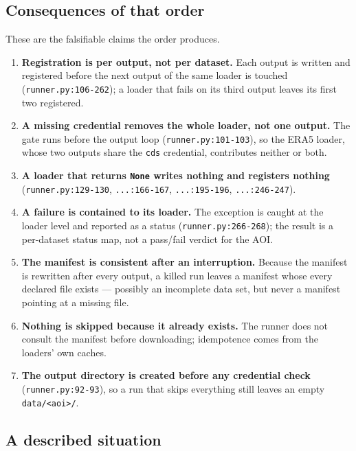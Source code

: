 \documentclass[11pt,a4paper]{article}
\newcommand{\code}[1]{\texttt{#1}}
\begin{document}
\subsection{Consequences of that order}

These are the falsifiable claims the order produces.

\begin{enumerate}
\item \textbf{Registration is per output, not per dataset.} Each output is
written and registered before the next output of the same loader is touched
(\code{runner.py:106-262}); a loader that fails on its third output leaves its
first two registered.
\item \textbf{A missing credential removes the whole loader, not one output.}
The gate runs before the output loop (\code{runner.py:101-103}), so the ERA5
loader, whose two outputs share the \code{cds} credential, contributes
neither or both.
\item \textbf{A loader that returns \code{None} writes nothing and registers
nothing} (\code{runner.py:129-130}, \code{...:166-167}, \code{...:195-196},
\code{...:246-247}).
\item \textbf{A failure is contained to its loader.} The exception is caught
at the loader level and reported as a status (\code{runner.py:266-268}); the
result is a per-dataset status map, not a pass/fail verdict for the AOI.
\item \textbf{The manifest is consistent after an interruption.} Because the
manifest is rewritten after every output, a killed run leaves a manifest
whose every declared file exists --- possibly an incomplete data set, but
never a manifest pointing at a missing file.
\item \textbf{Nothing is skipped because it already exists.} The runner does
not consult the manifest before downloading; idempotence comes from the
loaders' own caches.
\item \textbf{The output directory is created before any credential check}
(\code{runner.py:92-93}), so a run that skips everything still leaves an
empty \code{data/<aoi>/}.
\end{enumerate}

\subsection{A described situation}
\end{document}

